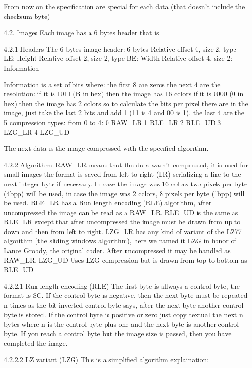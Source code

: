  From now on the specification are special for each data (that doesn't
 include the checksum byte)

4.2. Images
 Each image has a 6 bytes header that is

4.2.1 Headers
 The 6-bytes-image header: 6 bytes
  Relative offset 0, size 2, type LE: Height
  Relative offset 2, size 2, type BE: Width 
  Relative offset 4, size 2: Information

 Information is a set of bits where:
  the first 8 are zeros
  the next 4 are the resolution:
   if it is 1011 (B in hex) then the image has 16 colors
   if it is 0000 (0 in hex) then the image has 2 colors
   so to calculate the bits per pixel there are in the image, just take the
   last 2 bits and add 1 (11 is 4 and 00 is 1).
  the last 4 are the 5 compression types:
   from 0 to 4:
   0 RAW_LR
   1 RLE_LR
   2 RLE_UD
   3 LZG_LR
   4 LZG_UD

 The next data is the image compressed with the specified algorithm.

4.2.2 Algorithms
 RAW_LR means that the data wasn't compressed, it is used for small images
        the format is saved from left to right (LR) serializing a line to
        the next integer byte if necessary. In case the image was 16 colors
        two pixels per byte (4bpp) will be used, in case the image was 2
        colors, 8 pixels per byte (1bpp) will be used.
 RLE_LR has a Run length encoding (RLE) algorithm, after uncompressed the
        image can be read as a RAW_LR.
 RLE_UD is the same as RLE_LR except that after uncompressed the image must
        be drawn from up to down and then from left to right.
 LZG_LR has any kind of variant of the LZ77 algorithm (the sliding windows
        algorithm), here we named it LZG in honor of Lance Groody, the
        original coder.
        After uncompressed it may be handled as RAW_LR.
 LZG_UD Uses LZG compression but is drawn from top to bottom as RLE_UD

4.2.2.1 Run length encoding (RLE)
 The first byte is allways a control byte, the format is SC. If the control
 byte is negative, then the next byte must be repeated n times as the bit
 inverted control byte says, after the next byte another control byte is
 stored.
 If the control byte is positive or zero just copy textual the next n bytes
 where n is the control byte plus one and the next byte is another control
 byte.
 If you reach a control byte but the image size is passed, then you have
 completed the image.

4.2.2.2 LZ variant (LZG)
 This is a simplified algorithm explaination:

